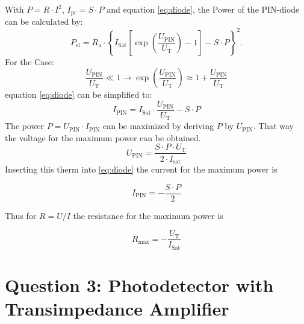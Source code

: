 With $P = R\cdot I^2$, $I_{\mathrm{pr}} = S\cdot P$ and equation \eqref{eq:diode}, the Power of the PIN-diode can be calculated by:
\begin{equation}
 P_{\mathrm{el}} = R_{\mathrm{a}}\cdot\left\{ I_{\mathrm{Sat}}\left[\exp\left(\frac{U_{\mathrm{PIN}}}{U_{\mathrm{T}}}\right)-1\right] -S\cdot P\right\}^2.
\label{eq:power}
\end{equation}
For the Case:
\begin{equation}
 \frac{U_{\mathrm{PIN}}}{U_{\mathrm{T}}} \ll 1 \to \exp\left(\frac{U_{\mathrm{PIN}}}{U_{\mathrm{T}}}\right)\approx1+\frac{U_{\mathrm{PIN}}}{U_{\mathrm{T}}}
\label{eq:vereinfachung}
\end{equation}
equation \eqref{eq:diode} can be simplified to:
%
\begin{equation}
I_{\mathrm{PIN}} = I_{\mathrm{Sat}}\cdot\frac{U_{\mathrm{PIN}}}{U_{\mathrm{T}}} -S\cdot P
\label{eq:}
\end{equation}
The power $P = U_{\mathrm{PIN}} \cdot I_{\mathrm{PIN}}$ can be maximized  by deriving $P$ by $U_{\mathrm{PIN}}$. That way the voltage for the maximum power can be obtained. 
\begin{equation}
U_{\mathrm{PIN}} = \frac{S\cdot P \cdot U_{\mathrm{T}}}{2\cdot I_{\mathrm{sat}}} 
\label{eq:}
\end{equation}
Inserting this therm into \eqref{eq:diode} the current for the maximum power is

\begin{equation}
I_{\mathrm{PIN}} = - \frac{S \cdot P}{2}
\label{eq:}
\end{equation}

Thus for $R = U/I$ the resistance for the maximum power is

\begin{equation}
R_{\mathrm{max}} = - \frac{U_{\mathrm{T}}}{I_{\mathrm{Sat}}}
\label{eq:}
\end{equation}


\section{Question 3: Photodetector with Transimpedance Amplifier}

